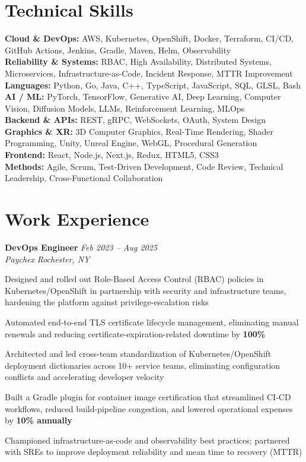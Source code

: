 \documentclass[letterpaper,10pt]{article}
\newcommand{\role}[4]{%
  \textbf{#1} \hfill \textit{#3}\\[-1pt]
  \textit{#2} \hfill \textit{#4}\par\vspace{2pt}
}
\begin{document}
\section*{Technical Skills}
\textbf{Cloud \& DevOps:} AWS, Kubernetes, OpenShift, Docker, Terraform, CI/CD, GitHub Actions, Jenkins, Gradle, Maven, Helm, Observability\\
\textbf{Reliability \& Systems:} RBAC, High Availability, Distributed Systems, Microservices, Infrastructure-as-Code, Incident Response, MTTR Improvement\\
\textbf{Languages:} Python, Go, Java, C++, TypeScript, JavaScript, SQL, GLSL, Bash\\
\textbf{AI / ML:} PyTorch, TensorFlow, Generative AI, Deep Learning, Computer Vision, Diffusion Models, LLMs, Reinforcement Learning, MLOps\\
\textbf{Backend \& APIs:} REST, gRPC, WebSockets, OAuth, System Design\\
\textbf{Graphics \& XR:} 3D Computer Graphics, Real-Time Rendering, Shader Programming, Unity, Unreal Engine, WebGL, Procedural Generation\\
\textbf{Frontend:} React, Node.js, Next.js, Redux, HTML5, CSS3\\
\textbf{Methods:} Agile, Scrum, Test-Driven Development, Code Review, Technical Leadership, Cross-Functional Collaboration

\section*{Work Experience}
\role{DevOps Engineer}{Paychex}{Feb 2023 -- Aug 2025}{Rochester, NY}
\begin{tightitemize}
  \item Designed and rolled out Role-Based Access Control (RBAC) policies in Kubernetes/OpenShift in partnership with security and infrastructure teams, hardening the platform against privilege-escalation risks
  \item Automated end-to-end TLS certificate lifecycle management, eliminating manual renewals and reducing certificate-expiration-related downtime by \textbf{100\%}
  \item Architected and led cross-team standardization of Kubernetes/OpenShift deployment dictionaries across 10+ service teams, eliminating configuration conflicts and accelerating developer velocity
  \item Built a Gradle plugin for container image certification that streamlined CI-CD workflows, reduced build-pipeline congestion, and lowered operational expenses by \textbf{10\% annually}
  \item Championed infrastructure-as-code and observability best practices; partnered with SREs to improve deployment reliability and mean time to recovery (MTTR)
\end{tightitemize}
\end{document}
